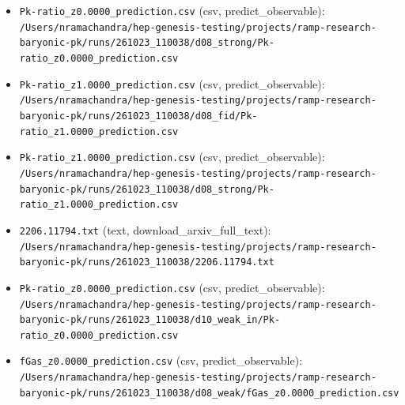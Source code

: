 \documentclass[11pt,a4paper]{article}
\begin{document}
\begin{itemize}
  \item \texttt{Pk-ratio\_\allowbreak{}z0.0000\_\allowbreak{}prediction.csv} (csv, predict\_observable): \texttt{/\allowbreak{}Users/\allowbreak{}nramachandra/\allowbreak{}hep-genesis-testing/\allowbreak{}projects/\allowbreak{}ramp-research-baryonic-pk/\allowbreak{}runs/\allowbreak{}261023\_\allowbreak{}110038/\allowbreak{}d08\_\allowbreak{}strong/\allowbreak{}Pk-ratio\_\allowbreak{}z0.0000\_\allowbreak{}prediction.csv}
  \item \texttt{Pk-ratio\_\allowbreak{}z1.0000\_\allowbreak{}prediction.csv} (csv, predict\_observable): \texttt{/\allowbreak{}Users/\allowbreak{}nramachandra/\allowbreak{}hep-genesis-testing/\allowbreak{}projects/\allowbreak{}ramp-research-baryonic-pk/\allowbreak{}runs/\allowbreak{}261023\_\allowbreak{}110038/\allowbreak{}d08\_\allowbreak{}fid/\allowbreak{}Pk-ratio\_\allowbreak{}z1.0000\_\allowbreak{}prediction.csv}
  \item \texttt{Pk-ratio\_\allowbreak{}z1.0000\_\allowbreak{}prediction.csv} (csv, predict\_observable): \texttt{/\allowbreak{}Users/\allowbreak{}nramachandra/\allowbreak{}hep-genesis-testing/\allowbreak{}projects/\allowbreak{}ramp-research-baryonic-pk/\allowbreak{}runs/\allowbreak{}261023\_\allowbreak{}110038/\allowbreak{}d08\_\allowbreak{}strong/\allowbreak{}Pk-ratio\_\allowbreak{}z1.0000\_\allowbreak{}prediction.csv}
  \item \texttt{2206.11794.txt} (text, download\_arxiv\_full\_text): \texttt{/\allowbreak{}Users/\allowbreak{}nramachandra/\allowbreak{}hep-genesis-testing/\allowbreak{}projects/\allowbreak{}ramp-research-baryonic-pk/\allowbreak{}runs/\allowbreak{}261023\_\allowbreak{}110038/\allowbreak{}2206.11794.txt}
  \item \texttt{Pk-ratio\_\allowbreak{}z0.0000\_\allowbreak{}prediction.csv} (csv, predict\_observable): \texttt{/\allowbreak{}Users/\allowbreak{}nramachandra/\allowbreak{}hep-genesis-testing/\allowbreak{}projects/\allowbreak{}ramp-research-baryonic-pk/\allowbreak{}runs/\allowbreak{}261023\_\allowbreak{}110038/\allowbreak{}d10\_\allowbreak{}weak\_\allowbreak{}in/\allowbreak{}Pk-ratio\_\allowbreak{}z0.0000\_\allowbreak{}prediction.csv}
  \item \texttt{fGas\_\allowbreak{}z0.0000\_\allowbreak{}prediction.csv} (csv, predict\_observable): \texttt{/\allowbreak{}Users/\allowbreak{}nramachandra/\allowbreak{}hep-genesis-testing/\allowbreak{}projects/\allowbreak{}ramp-research-baryonic-pk/\allowbreak{}runs/\allowbreak{}261023\_\allowbreak{}110038/\allowbreak{}d08\_\allowbreak{}weak/\allowbreak{}fGas\_\allowbreak{}z0.0000\_\allowbreak{}prediction.csv}

\end{itemize}
\end{document}
